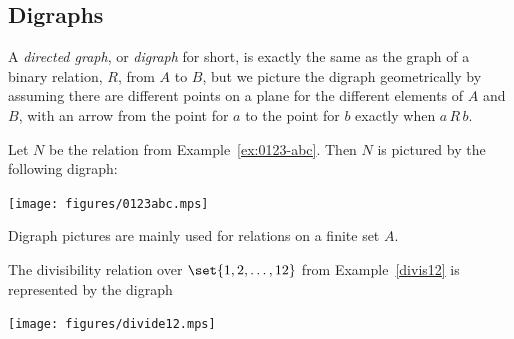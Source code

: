\subsection{Digraphs} 

A \emph{directed graph}, or \emph{digraph} for short, is exactly the same
as the graph of a binary relation, $R$, from $A$ to $B$, but we picture
the digraph geometrically by assuming there are different points on a
plane for the different elements of $A$ and $B$, with an arrow from the
point for $a$ to the point for $b$ exactly when $a\, R\, b$.

\begin{example}
Let $N$ be the relation from Example~\ref{ex:0123-abc}.  Then $N$ is
pictured by the following digraph:
\begin{center}\texttt{[image: figures/0123abc.mps]}\end{center}
\end{example}

Digraph pictures are mainly used for relations on a finite set $A$.

\begin{example}
\begin{samepage}
The divisibility relation over $\set{1,2,\dots,12}$ from
Example~\ref{divis12} is represented by the digraph
\begin{center}
\texttt{[image: figures/divide12.mps]}
\end{center}
\end{samepage}
\end{example}

